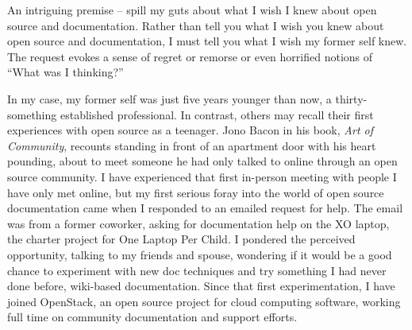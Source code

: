 





\noindent{}An intriguing premise -- spill my guts about what I wish I knew about open
source and documentation. Rather than tell you what I wish you knew about open
source and documentation, I must tell you what I wish my former self knew. The
request evokes a sense of regret or remorse or even horrified notions of ``What
was I thinking?'' 

In my case, my former self was just five years younger than now, a
thirty-something established professional. In contrast, others may recall their
first experiences with open source as a teenager. Jono Bacon in his book,
\textit{Art of Community}, recounts standing in front of an apartment door with
his heart pounding, about to meet someone he had only talked to online through
an open source community. I have experienced that first in-person meeting with
people I have only met online, but my first serious foray into the world of open
source documentation came when I responded to an emailed request for help. The
email was from a former coworker, asking for documentation help on the XO
laptop, the charter project for One Laptop Per Child. I pondered the perceived
opportunity, talking to my friends and spouse, wondering if it would be a good
chance to experiment with new doc techniques and try something I had never done
before, wiki-based documentation. Since that first experimentation, I have joined
OpenStack, an open source project for cloud computing software, working full
time on community documentation and support efforts. 

